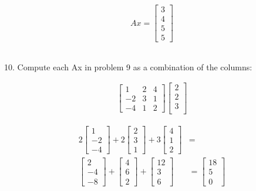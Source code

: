 \documentclass[paper=a4, fontsize=10pt]{scrartcl} %
\begin{document}
	\begin{align*}
		Ax =
		\begin{bmatrix}
			3 \\
			4 \\
			5 \\
			5
		\end{bmatrix}
	\end{align*}

\subsection*{}
\setcounter{equation}{0}
10. Compute each Ax in problem 9 as a combination of the columns:

	\begin{align*}
		\begin{bmatrix}
			  1 & 2 & 4 \\
			 -2 & 3 & 1 \\
			 -4 & 1 & 2
 		\end{bmatrix}
 		\begin{bmatrix}
			 2 \\
			 2 \\
			 3 \\
 		\end{bmatrix}
	\end{align*}

	\begin{align*}
		2
		\begin{bmatrix}
			1 \\ -2 \\ -4
		\end{bmatrix}
		+ 2
		\begin{bmatrix}
			2 \\ 3 \\ 1
		\end{bmatrix}
		+ 3
		\begin{bmatrix}
			4 \\ 1 \\ 2
		\end{bmatrix}
		&= \\
		\begin{bmatrix}
			2 \\ -4 \\ -8
		\end{bmatrix}
		+
		\begin{bmatrix}
			4 \\ 6 \\ 2
		\end{bmatrix}
		+
		\begin{bmatrix}
			12 \\ 3 \\ 6
		\end{bmatrix}
		&=
		\begin{bmatrix}
			18 \\ 5 \\ 0
		\end{bmatrix}
	\end{align*}
\end{document}

